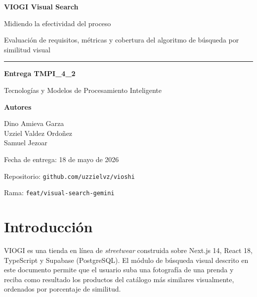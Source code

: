 \documentclass[11pt,letterpaper]{article}
\begin{document}
\begin{titlepage}
  \centering
  \vspace*{1.5cm}
  {\Huge\bfseries VIOGI \textbullet{} Visual Search\par}
  \vspace{0.4cm}
  {\Large Midiendo la efectividad del proceso\par}
  \vspace{0.2cm}
  {\large Evaluación de requisitos, métricas y cobertura del algoritmo de búsqueda por similitud visual\par}
  \vspace{1.5cm}

  \rule{0.7\linewidth}{0.6pt}
  \vspace{0.6cm}

  {\large\bfseries Entrega TMPI\_4\_2\par}
  \vspace{0.2cm}
  {\normalsize Tecnologías y Modelos de Procesamiento Inteligente\par}

  \vfill

  {\large\bfseries Autores\par}
  \vspace{0.3cm}
  {\large
    Dino Amieva Garza\\[2pt]
    Uzziel Valdez Ordoñez\\[2pt]
    Samuel Jezoar\\
  }

  \vspace{1.2cm}

  {\normalsize Fecha de entrega: 18 de mayo de 2026\par}
  {\normalsize Repositorio: \texttt{github.com/uzzielvz/vioshi}\par}
  {\normalsize Rama: \texttt{feat/visual-search-gemini}\par}
\end{titlepage}

\tableofcontents
\newpage

\section{Introducción}

VIOGI es una tienda en línea de \textit{streetwear} construida sobre Next.js 14, React 18, TypeScript y Supabase (PostgreSQL). El módulo de búsqueda visual descrito en este documento permite que el usuario suba una fotografía de una prenda y reciba como resultado los productos del catálogo más similares visualmente, ordenados por porcentaje de similitud.
\end{document}
